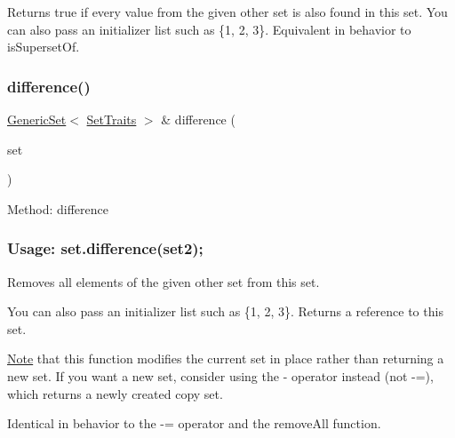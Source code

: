  Returns {\ttfamily true} if every value from the given other set is also found in this set. You can also pass an initializer list such as \{1, 2, 3\}. Equivalent in behavior to is\+Superset\+Of. \mbox{\label{classstanfordcpplib_1_1collections_1_1GenericSet_af6112917491bf7803154d808ad93518d}} 
\subsubsection{\texorpdfstring{difference()}{difference()}}
{\footnotesize\ttfamily \mbox{\hyperlink{classstanfordcpplib_1_1collections_1_1GenericSet}{Generic\+Set}}$<$ \mbox{\hyperlink{structstanfordcpplib_1_1collections_1_1SetTraits}{Set\+Traits}} $>$ \& difference (\begin{DoxyParamCaption}\item[{const \mbox{\hyperlink{classstanfordcpplib_1_1collections_1_1GenericSet}{Generic\+Set}}$<$ \mbox{\hyperlink{structstanfordcpplib_1_1collections_1_1SetTraits}{Set\+Traits}} $>$ \&}]{set }\end{DoxyParamCaption})}



Method\+: difference \subsubsection*{Usage\+: set.\+difference(set2); }

Removes all elements of the given other set from this set. 

You can also pass an initializer list such as \{1, 2, 3\}. Returns a reference to this set.

\mbox{\hyperlink{classNote}{Note}} that this function modifies the current set in place rather than returning a new set. If you want a new set, consider using the -\/ operator instead (not -\/=), which returns a newly created copy set.

Identical in behavior to the -\/= operator and the remove\+All function. \mbox{\label{classstanfordcpplib_1_1collections_1_1GenericSet_a68b688a51bd0cf6fb5bc2cba292209a8}} 
